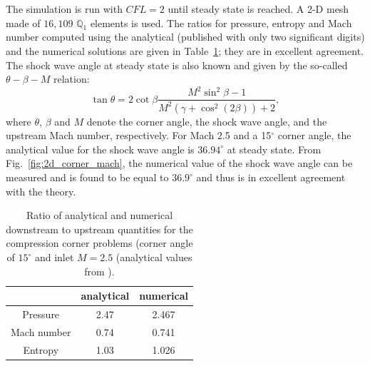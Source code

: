 \documentclass[review,10pt]{elsarticle}
\newcommand{\fig}[1]{Fig.~\ref{#1}}                      %
\newcommand{\tbl}[1]{Table~\ref{#1}}                     %
\begin{document}
The simulation is run with $CFL=2$ until steady state is reached. A 2-D mesh made of $16,109$ $\mathbb{Q}_1$ elements 
is used. The ratios for pressure, entropy and Mach number computed using the analytical (published with only two 
significant digits) and the numerical solutions are given in \tbl{tbl:corner_exact_sol}; they are in excellent 
agreement. The shock wave angle at steady state is also known and given by the so-called $\theta -\beta -M$ relation:
%
\begin{equation}
\tan \theta = 2 \cot \beta \frac{M^2 \sin^2 \beta -1}{M^2 \left(\gamma+\cos^2 (2\beta)\right)+2} ,
\end{equation}
%
where $\theta$, $\beta$ and $M$ denote the corner angle, the shock wave angle, and the upstream Mach number, respectively. 
For Mach 2.5 and a 15$^\circ$ corner angle, the analytical value for the shock wave angle is $36.94^\circ$ 
at steady state. From \fig{fig:2d_corner_mach}, the numerical value of the shock wave angle can be measured 
and is found to be equal to $36.9^{\circ}$ and thus is in excellent agreement with the theory.
%
\begin{table}[H]
\begin{center}
\begin{tabular}{|c|c|c|}  \hline
            & analytical & numerical\\ \hline
Pressure    & 2.47       & 2.467    \\ \hline
Mach number &  0.74      & 0.741    \\ \hline
Entropy     & 1.03       & 1.026    \\ \hline 
\end{tabular}
\caption{\label{tbl:corner_exact_sol} Ratio of analytical and numerical downstream to upstream quantities for 
the compression corner problems (corner angle of $15^\circ$ and inlet $M=2.5$ (analytical values from \cite{CompressionCorner}).}
\end{center}
\end{table}
%
\end{document}
